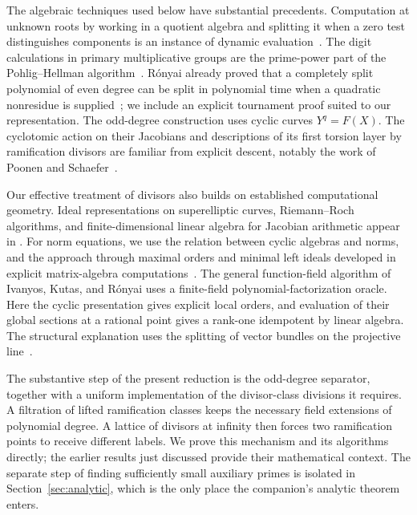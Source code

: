The algebraic techniques used below have substantial precedents.
Computation at unknown roots by working in a quotient algebra and
splitting it when a zero test distinguishes components is an instance of
dynamic evaluation~\cite{DellaDoraDicrescenzoDuval85,Duval94}.
The digit calculations in primary multiplicative groups are the
prime-power part of the Pohlig--Hellman algorithm~\cite{PohligHellman78}.
R\'onyai already proved that a completely split polynomial of even degree
can be split in polynomial time when a quadratic nonresidue is
supplied~\cite{Ronyai88}; we include an explicit tournament proof suited
to our representation.  The odd-degree construction uses cyclic curves
$Y^q=F(X)$.  The cyclotomic action on their Jacobians and descriptions of
its first torsion layer by ramification divisors are familiar from
explicit descent, notably the work of Poonen and
Schaefer~\cite[Sections~4 and~6]{PoonenSchaefer97}.

Our effective treatment of divisors also builds on established
computational geometry.  Ideal representations on superelliptic curves,
Riemann--Roch algorithms, and finite-dimensional linear algebra for
Jacobian arithmetic appear in
\cite{GPS02,Hess02,KhuriMakdisi04}.  For norm equations, we use the
relation between cyclic algebras and norms, and the approach through
maximal orders and minimal left ideals developed in explicit
matrix-algebra computations~\cite{GilleSzamuely06,IRS12,IKR18}.
The general function-field algorithm of Ivanyos, Kutas, and R\'onyai
uses a finite-field polynomial-factorization oracle.  Here the cyclic
presentation gives explicit local orders, and evaluation of their global
sections at a rational point gives a rank-one idempotent by linear
algebra.  The structural explanation uses the splitting of vector
bundles on the projective line~\cite{Grothendieck57,HazewinkelMartin82}.

The substantive step of the present reduction is the odd-degree
separator, together with a uniform implementation of the divisor-class
divisions it requires.  A filtration of lifted ramification classes
keeps the necessary field extensions of polynomial degree.  A lattice
of divisors at infinity then forces two ramification points to receive
different labels.  We prove this mechanism and its algorithms directly;
the earlier results just discussed provide their mathematical context.
The separate step of finding sufficiently small auxiliary primes is
isolated in Section~\ref{sec:analytic}, which is the only place the
companion's analytic theorem enters.

